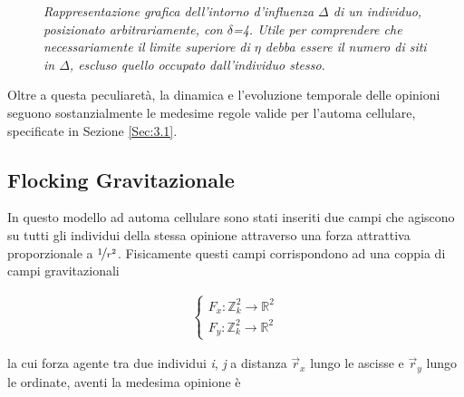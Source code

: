 \documentclass[letterpaper,10pt]{article}
\begin{document}
\begin{figure}[h]
\centering
{}
\caption{\textit{Rappresentazione grafica dell'intorno d'influenza $\Delta$ di un individuo, posizionato arbitrariamente, con $\delta$=4. Utile per comprendere che necessariamente il limite superiore di $\eta$ debba essere il numero di siti in $\Delta$, escluso quello occupato dall'individuo stesso.}}
\label{Fig:6}
\end{figure}

Oltre a questa peculiaretà, la dinamica e l'evoluzione temporale delle opinioni seguono sostanzialmente le medesime regole valide per l'automa cellulare, specificate in Sezione \ref{Sec:3.1}.


\subsection{Flocking Gravitazionale}
\label{Sec:3.3}

In questo modello ad automa cellulare sono stati inseriti due campi che agiscono su tutti gli individui della stessa opinione attraverso una forza attrattiva proporzionale a $\nicefrac{1}{r^2}$. Fisicamente questi campi corrispondono ad una coppia di campi gravitazionali

\begin{equation}
\begin{aligned}
\begin{cases}
F_x:  \mathbb{Z}^2_k \rightarrow \mathbb{R}^2 \\
F_y:  \mathbb{Z}^2_k \rightarrow \mathbb{R}^2 
\end{cases}
\end{aligned}
\label{Eq:4}
\end{equation}

la cui forza agente tra due individui \textit{i}, \textit{j} a distanza $\vec{r}_{x}$ lungo le ascisse e $\vec{r}_{y}$ lungo le ordinate, aventi la medesima opinione è
\end{document}
